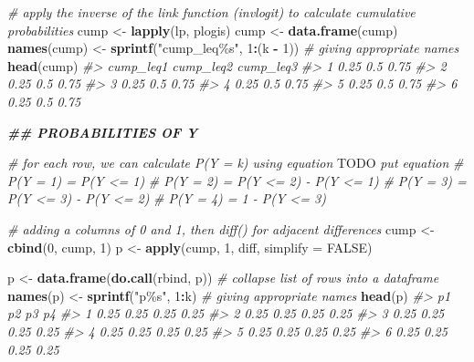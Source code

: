 \documentclass[
  man,floatsintext]{apa6}
\newenvironment{Shaded}{\begin{snugshade}}{\end{snugshade}}
\newcommand{\AlertTok}[1]{\textcolor[rgb]{0.94,0.16,0.16}{#1}}
\newcommand{\AttributeTok}[1]{\textcolor[rgb]{0.13,0.29,0.53}{#1}}
\newcommand{\CommentTok}[1]{\textcolor[rgb]{0.56,0.35,0.01}{\textit{#1}}}
\newcommand{\ConstantTok}[1]{\textcolor[rgb]{0.56,0.35,0.01}{#1}}
\newcommand{\DecValTok}[1]{\textcolor[rgb]{0.00,0.00,0.81}{#1}}
\newcommand{\DocumentationTok}[1]{\textcolor[rgb]{0.56,0.35,0.01}{\textbf{\textit{#1}}}}
\newcommand{\FunctionTok}[1]{\textcolor[rgb]{0.13,0.29,0.53}{\textbf{#1}}}
\newcommand{\NormalTok}[1]{#1}
\newcommand{\OtherTok}[1]{\textcolor[rgb]{0.56,0.35,0.01}{#1}}
\newcommand{\SpecialCharTok}[1]{\textcolor[rgb]{0.81,0.36,0.00}{\textbf{#1}}}
\newcommand{\StringTok}[1]{\textcolor[rgb]{0.31,0.60,0.02}{#1}}
\begin{document}
\begin{Shaded}
\begin{Highlighting}[]
\CommentTok{\# apply the inverse of the link function (invlogit) to calculate cumulative probabilities}
\NormalTok{cump }\OtherTok{\textless{}{-}} \FunctionTok{lapply}\NormalTok{(lp, plogis)}
\NormalTok{cump }\OtherTok{\textless{}{-}} \FunctionTok{data.frame}\NormalTok{(cump)}
\FunctionTok{names}\NormalTok{(cump) }\OtherTok{\textless{}{-}} \FunctionTok{sprintf}\NormalTok{(}\StringTok{"cump\_leq\%s"}\NormalTok{, }\DecValTok{1}\SpecialCharTok{:}\NormalTok{(k }\SpecialCharTok{{-}} \DecValTok{1}\NormalTok{)) }\CommentTok{\# giving appropriate names}
\FunctionTok{head}\NormalTok{(cump)}
\CommentTok{\#\textgreater{}   cump\_leq1 cump\_leq2 cump\_leq3}
\CommentTok{\#\textgreater{} 1      0.25       0.5      0.75}
\CommentTok{\#\textgreater{} 2      0.25       0.5      0.75}
\CommentTok{\#\textgreater{} 3      0.25       0.5      0.75}
\CommentTok{\#\textgreater{} 4      0.25       0.5      0.75}
\CommentTok{\#\textgreater{} 5      0.25       0.5      0.75}
\CommentTok{\#\textgreater{} 6      0.25       0.5      0.75}

\DocumentationTok{\#\# PROBABILITIES OF Y}

\CommentTok{\# for each row, we can calculate P(Y = k) using equation }\AlertTok{TODO}\CommentTok{ put equation}
\CommentTok{\# P(Y = 1) = P(Y \textless{}= 1)}
\CommentTok{\# P(Y = 2) = P(Y \textless{}= 2) {-} P(Y \textless{}= 1)}
\CommentTok{\# P(Y = 3) = P(Y \textless{}= 3) {-} P(Y \textless{}= 2)}
\CommentTok{\# P(Y = 4) = 1 {-} P(Y \textless{}= 3)}

\CommentTok{\# adding a columns of 0 and 1, then diff() for adjacent differences}
\NormalTok{cump }\OtherTok{\textless{}{-}} \FunctionTok{cbind}\NormalTok{(}\DecValTok{0}\NormalTok{, cump, }\DecValTok{1}\NormalTok{)}
\NormalTok{p }\OtherTok{\textless{}{-}} \FunctionTok{apply}\NormalTok{(cump, }\DecValTok{1}\NormalTok{, diff, }\AttributeTok{simplify =} \ConstantTok{FALSE}\NormalTok{)}

\NormalTok{p }\OtherTok{\textless{}{-}} \FunctionTok{data.frame}\NormalTok{(}\FunctionTok{do.call}\NormalTok{(rbind, p)) }\CommentTok{\# collapse list of rows into a dataframe}
\FunctionTok{names}\NormalTok{(p) }\OtherTok{\textless{}{-}} \FunctionTok{sprintf}\NormalTok{(}\StringTok{"p\%s"}\NormalTok{, }\DecValTok{1}\SpecialCharTok{:}\NormalTok{k) }\CommentTok{\# giving appropriate names}
\FunctionTok{head}\NormalTok{(p)}
\CommentTok{\#\textgreater{}     p1   p2   p3   p4}
\CommentTok{\#\textgreater{} 1 0.25 0.25 0.25 0.25}
\CommentTok{\#\textgreater{} 2 0.25 0.25 0.25 0.25}
\CommentTok{\#\textgreater{} 3 0.25 0.25 0.25 0.25}
\CommentTok{\#\textgreater{} 4 0.25 0.25 0.25 0.25}
\CommentTok{\#\textgreater{} 5 0.25 0.25 0.25 0.25}
\CommentTok{\#\textgreater{} 6 0.25 0.25 0.25 0.25}


\end{Highlighting}
\end{Shaded}
\end{document}
